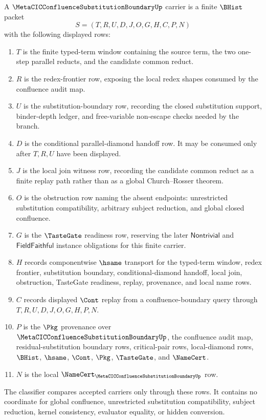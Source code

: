 \begin{definition}
\label{def:metacic-confluence-substitution-boundary-carrier}
A $\MetaCICConfluenceSubstitutionBoundaryUp$ carrier is a finite $\BHist$ packet
$$
S=(T,R,U,D,J,O,G,H,C,P,N)
$$
with the following displayed rows:
\begin{enumerate}
\item $T$ is the finite typed-term window containing the source term, the two one-step parallel reducts, and the candidate common reduct.
\item $R$ is the redex-frontier row, exposing the local redex shapes consumed by the confluence audit map.
\item $U$ is the substitution-boundary row, recording the closed substitution support, binder-depth ledger, and free-variable non-escape checks needed by the branch.
\item $D$ is the conditional parallel-diamond handoff row. It may be consumed only after $T,R,U$ have been displayed.
\item $J$ is the local join witness row, recording the candidate common reduct as a finite replay path rather than as a global Church--Rosser theorem.
\item $O$ is the obstruction row naming the absent endpoints: unrestricted substitution compatibility, arbitrary subject reduction, and global closed confluence.
\item $G$ is the $\TasteGate$ readiness row, reserving the later $\mathsf{Nontrivial}$ and $\mathsf{FieldFaithful}$ instance obligations for this finite carrier.
\item $H$ records componentwise $\hsame$ transport for the typed-term window, redex frontier, substitution boundary, conditional-diamond handoff, local join, obstruction, TasteGate readiness, replay, provenance, and local name rows.
\item $C$ records displayed $\Cont$ replay from a confluence-boundary query through $T,R,U,D,J,O,G,H,P,N$.
\item $P$ is the $\Pkg$ provenance over $\MetaCICConfluenceSubstitutionBoundaryUp$, the confluence audit map, residual-substitution boundary rows, critical-pair rows, local-diamond rows, $\BHist$, $\hsame$, $\Cont$, $\Pkg$, $\TasteGate$, and $\NameCert$.
\item $N$ is the local $\NameCert_{\MetaCICConfluenceSubstitutionBoundaryUp}$ row.
\end{enumerate}
The classifier compares accepted carriers only through these rows. It contains no coordinate for global confluence, unrestricted substitution compatibility, subject reduction, kernel consistency, evaluator equality, or hidden conversion.
\end{definition}

